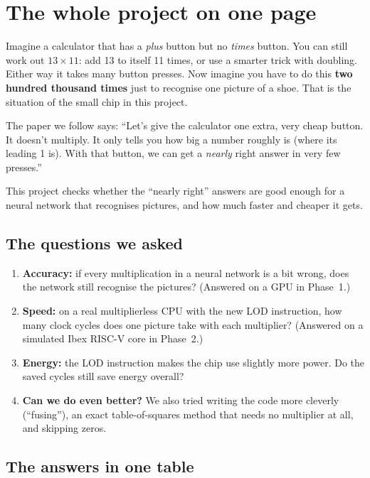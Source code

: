 \section{The whole project on one page}

\begin{kid}
Imagine a calculator that has a \emph{plus} button but no \emph{times} button. You can still
work out $13\times 11$: add 13 to itself 11 times, or use a smarter trick with doubling.
Either way it takes many button presses. Now imagine you have to do this
\textbf{two hundred thousand times} just to recognise one picture of a shoe. That is the
situation of the small chip in this project.

The paper we follow says: ``Let's give the calculator one extra, very cheap button. It doesn't
multiply. It only tells you how big a number roughly is (where its leading 1 is). With that
button, we can get a \emph{nearly} right answer in very few presses.''

This project checks whether the ``nearly right'' answers are good enough for a neural network that
recognises pictures, and how much faster and cheaper it gets.
\end{kid}

\subsection*{The questions we asked}
\begin{enumerate}
  \item \textbf{Accuracy:} if every multiplication in a neural network is a bit wrong, does the
        network still recognise the pictures? (Answered on a GPU in Phase~1.)
  \item \textbf{Speed:} on a real multiplierless CPU with the new LOD instruction, how many clock
        cycles does one picture take with each multiplier? (Answered on a simulated Ibex
        RISC-V core in Phase~2.)
  \item \textbf{Energy:} the LOD instruction makes the chip use slightly more power. Do the saved
        cycles still save energy overall?
  \item \textbf{Can we do even better?} We also tried writing the code more cleverly (``fusing''),
        an exact table-of-squares method that needs no multiplier at all, and skipping zeros.
\end{enumerate}

\subsection*{The answers in one table}

